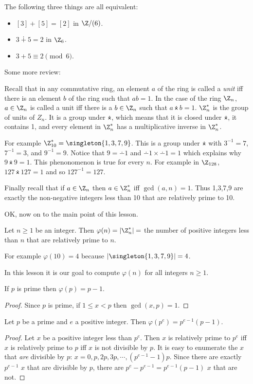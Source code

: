 \documentclass[oneside,12pt]{amsart}
\begin{document}
The following three things are all equivalent:
\begin{itemize}
\item $[3] + [5] = [2]$ in $\Z/(6)$.
\item $3 \dotplus 5 = 2$ in $\Z_6$.
\item $3 + 5 \equiv 2 \pmod 6$.
\end{itemize}

Some more review:

Recall that in any commutative ring, an element $a$ of the ring is called a \emph{unit} iff there is an element
$b$ of the ring such that $ab=1$. In the case of the ring $\Z_n$, $a\in\Z_n$ is called a unit iff there is a
$b\in\Z_n$ such that $a\dottimes b = 1$. $\Z^*_n$ is the group of units of $Z_n$. It is a group under
$\dottimes$, which means that it is closed under $\dottimes$, it contains 1, and every element in
$\Z_n^*$ has a multiplicative inverse in $\Z^*_n$.

For example $\Z^*_{10} = \singleton{1,3,7,9}$. This is a group under $\dottimes$ with
$3^{-1} = 7$,  $7^{-1} = 3$, and $9^{-1} = 9$. Notice that $9 = \dotminus 1$ and $\dotminus 1 \times \dotminus 1 = 1$ which explains why $9\dottimes 9 = 1$. This phenonomenon is true for every $n$. For example
in $\Z_{128}$, $127\dottimes 127 = 1$ and so $127^{-1} = 127$.

Finally recall that if $a\in\Z_n$ then $a\in\Z^*_n$ iff $\gcd(a,n) = 1$. Thus 1,3,7,9 are exactly the
non-negative integers less than 10 that are relatively prime to 10.

OK, now on to the main point of this lesson.

\begin{definition}
Let $n\geq 1$ be an integer. Then $\varphi(n) = |\Z_n^*| = $ the number of positive integers less than $n$ that are relatively prime to $n$.
\end{definition}

For example $\varphi(10) = 4$ because $|\singleton{1,3,7,9}|=4$.

In this lesson it is our goal to compute $\varphi(n)$ for all integers $n\geq 1$.

\begin{theorem}
If $p$ is prime then $\varphi(p) = p-1$.
\end{theorem}
\begin{proof}
Since $p$ is prime, if $1\leq x < p$ then $\gcd(x,p) = 1$.
\end{proof}

\begin{theorem}
Let $p$ be a prime and $e$  a positive integer. Then $\varphi(p^e) = p^{e-1}(p-1)$.
\end{theorem}
\begin{proof}
Let $x$ be a positive integer less than $p^e$. Then $x$ is relatively prime to $p^e$ iff
$x$ is relatively prime to $p$ iff $x$ is not divisible by $p$. It is easy to enumerate the
 $x$ that \emph{are} divisible by $p$: $x = 0, p,2p,3p,\cdots,(p^{e-1} - 1)p$. Since there are exactly
 $p^{e-1}$ $x$ that are divisible by $p$, there are $p^e - p^{e-1} = p^{e-1}(p-1)$ $x$ that are not.
\end{proof}
\end{document}
